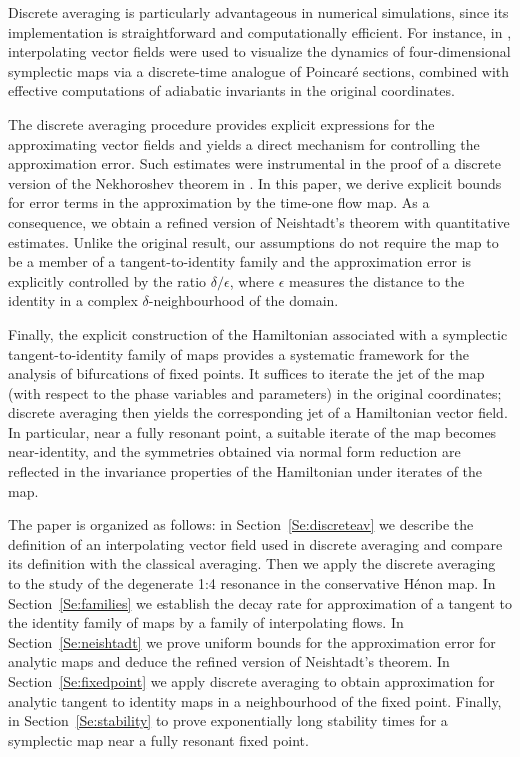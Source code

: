 \documentclass[a4paper,12pt]{article}
\begin{document}
Discrete averaging is particularly advantageous in numerical simulations, since its implementation is straightforward and computationally efficient. For instance, in \cite{GelfreichV18}, interpolating vector fields were used to visualize the dynamics of four-dimensional symplectic maps via a discrete-time analogue of Poincaré sections, combined with effective computations of adiabatic invariants in the original coordinates. 

The discrete averaging procedure provides explicit expressions for the approximating vector fields and yields a direct mechanism for controlling the approximation error. 
Such estimates were instrumental in the proof of a discrete version of the Nekhoroshev theorem in \cite{GelfreichV26}.
 In this paper, we derive explicit bounds for  error terms in the approximation by the time-one flow map. As a consequence, we obtain a refined version of Neishtadt’s theorem with quantitative estimates. Unlike the original result, our assumptions do not require the map to be a member of a
tangent-to-identity family and the approximation error is explicitly controlled by the ratio $\delta/\epsilon$, where $\epsilon$ measures the distance to the identity in a complex $\delta$-neighbourhood of the domain. 

Finally, the explicit construction of the Hamiltonian associated with a symplectic tangent-to-identity family of maps provides a systematic framework for the analysis of bifurcations of fixed points. It suffices to iterate the jet of the map (with respect to the phase variables and parameters) in the original coordinates; discrete averaging then yields the corresponding jet of a Hamiltonian vector field. In particular, near a  fully resonant point, a suitable iterate of the map becomes near-identity, and the symmetries obtained via normal form reduction are reflected in the invariance properties of the Hamiltonian under iterates of the map. 

The paper is organized as follows: in Section~\ref{Se:discreteav} we describe the 
definition of an interpolating vector field used in discrete averaging
and compare its definition with the classical averaging. Then we apply 
the discrete averaging to the study of the degenerate 1:4 resonance in the conservative Hénon map. In Section~\ref{Se:families} we establish the decay rate for approximation
of a tangent to the identity family of maps by a family of interpolating flows. 
In Section~\ref{Se:neishtadt} we prove uniform bounds for the approximation error for analytic maps and deduce the refined version of Neishtadt's theorem. 
In Section~\ref{Se:fixedpoint} we apply discrete averaging to obtain 
approximation for analytic tangent to identity maps in a neighbourhood of the fixed point. 
Finally, in Section~\ref{Se:stability} to prove exponentially long stability times for a symplectic map near
a fully resonant fixed point.
\end{document}
